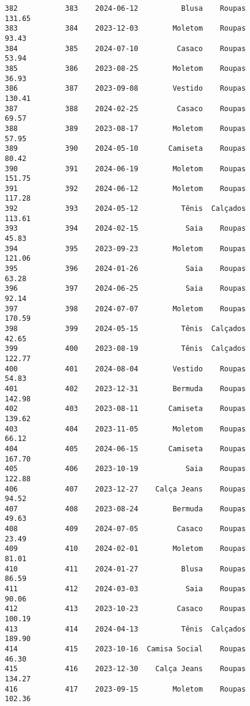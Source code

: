 \documentclass[11pt]{article}
\begin{document}
\begin{Verbatim}[commandchars=\\\{\}]
382           383    2024-06-12          Blusa    Roupas          131.65   
383           384    2023-12-03        Moletom    Roupas           93.43   
384           385    2024-07-10         Casaco    Roupas           53.94   
385           386    2023-08-25        Moletom    Roupas           36.93   
386           387    2023-09-08        Vestido    Roupas          130.41   
387           388    2024-02-25         Casaco    Roupas           69.57   
388           389    2023-08-17        Moletom    Roupas           57.95   
389           390    2024-05-10       Camiseta    Roupas           80.42   
390           391    2024-06-19        Moletom    Roupas          151.75   
391           392    2024-06-12        Moletom    Roupas          117.28   
392           393    2024-05-12          Tênis  Calçados          113.61   
393           394    2024-02-15           Saia    Roupas           45.83   
394           395    2023-09-23        Moletom    Roupas          121.06   
395           396    2024-01-26           Saia    Roupas           63.28   
396           397    2024-06-25           Saia    Roupas           92.14   
397           398    2024-07-07        Moletom    Roupas          170.59   
398           399    2024-05-15          Tênis  Calçados           42.65   
399           400    2023-08-19          Tênis  Calçados          122.77   
400           401    2024-08-04        Vestido    Roupas           54.83   
401           402    2023-12-31        Bermuda    Roupas          142.98   
402           403    2023-08-11       Camiseta    Roupas          139.62   
403           404    2023-11-05        Moletom    Roupas           66.12   
404           405    2024-06-15       Camiseta    Roupas          167.70   
405           406    2023-10-19           Saia    Roupas          122.88   
406           407    2023-12-27    Calça Jeans    Roupas           94.52   
407           408    2023-08-24        Bermuda    Roupas           49.63   
408           409    2024-07-05         Casaco    Roupas           23.49   
409           410    2024-02-01        Moletom    Roupas           81.01   
410           411    2024-01-27          Blusa    Roupas           86.59   
411           412    2024-03-03           Saia    Roupas           90.06   
412           413    2023-10-23         Casaco    Roupas          100.19   
413           414    2024-04-13          Tênis  Calçados          189.90   
414           415    2023-10-16  Camisa Social    Roupas           46.30   
415           416    2023-12-30    Calça Jeans    Roupas          134.27   
416           417    2023-09-15        Moletom    Roupas          102.36   

\end{Verbatim}
\end{document}

